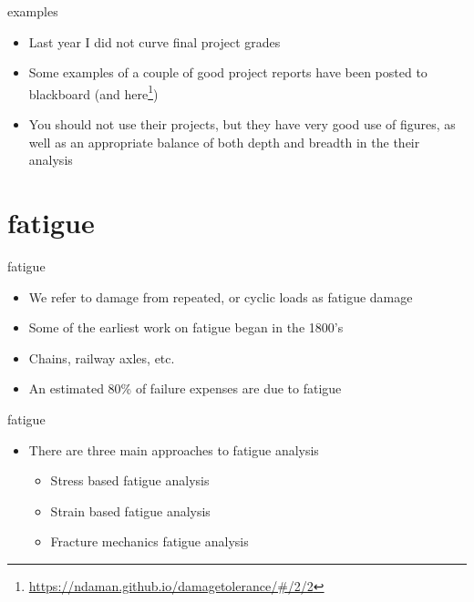 \documentclass[
  letterpaper,
  ignorenonframetext,
  aspectratio=43,
  handout,
  12pt]{beamer}
\DeclareRobustCommand{\href}[2]{#2\footnote{\url{#1}}}
\providecommand{\tightlist}{%
  \setlength{\itemsep}{0pt}\setlength{\parskip}{0pt}}
\providecommand{\tightlist}{%
\setlength{\itemsep}{0pt}\setlength{\parskip}{0pt}}
\begin{document}
\begin{frame}{examples}
\protect\hypertarget{examples}{}
\begin{itemize}
\tightlist
\item
  Last year I did not curve final project grades
\item
  Some examples of a couple of good project reports have been posted to
  blackboard (and
  \href{https://ndaman.github.io/damagetolerance/\#/2/2}{here})
\item
  You should not use their projects, but they have very good use of
  figures, as well as an appropriate balance of both depth and breadth
  in the their analysis
\end{itemize}
\end{frame}

\hypertarget{fatigue}{%
\section{fatigue}\label{fatigue}}

\begin{frame}{fatigue}
\protect\hypertarget{fatigue-1}{}
\begin{itemize}
\tightlist
\item
  We refer to damage from repeated, or cyclic loads as fatigue damage
\item
  Some of the earliest work on fatigue began in the 1800's
\item
  Chains, railway axles, etc.
\item
  An estimated 80\% of failure expenses are due to fatigue
\end{itemize}
\end{frame}

\begin{frame}{fatigue}
\protect\hypertarget{fatigue-2}{}
\begin{itemize}
\tightlist
\item
  There are three main approaches to fatigue analysis

  \begin{itemize}
  \tightlist
  \item
    Stress based fatigue analysis
  \item
    Strain based fatigue analysis
  \item
    Fracture mechanics fatigue analysis
  \end{itemize}
\end{itemize}
\end{frame}
\end{document}
